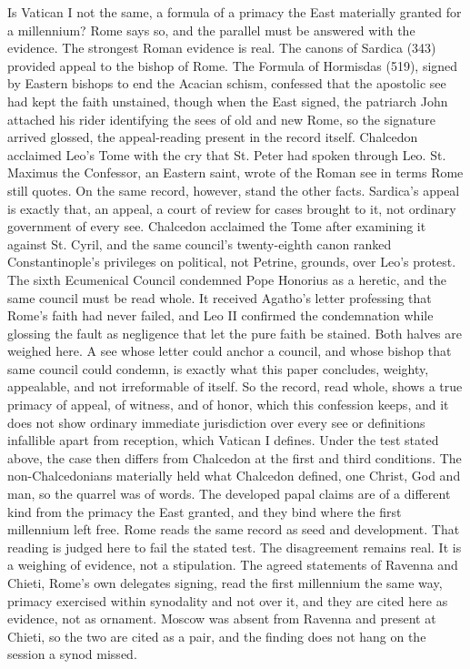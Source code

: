\documentclass[11pt,twoside]{article}
\newcommand{\unit}[1]{\needspace{3\baselineskip}\par\medskip{\normalfont\bfseries\color{subhead}#1}\par\nobreak\smallskip}
\begin{document}
\unit{The Roman evidence weighed.}
Is Vatican I not the same, a formula of a primacy the East materially granted for a millennium? Rome says so, and the parallel must be answered with the evidence. The strongest Roman evidence is real. The canons of Sardica (343) provided appeal to the bishop of Rome. The Formula of Hormisdas (519), signed by Eastern bishops to end the Acacian schism, confessed that the apostolic see had kept the faith unstained, though when the East signed, the patriarch John attached his rider identifying the sees of old and new Rome, so the signature arrived glossed, the appeal-reading present in the record itself. Chalcedon acclaimed Leo's Tome with the cry that St. Peter had spoken through Leo. St. Maximus the Confessor, an Eastern saint, wrote of the Roman see in terms Rome still quotes. On the same record, however, stand the other facts. Sardica's appeal is exactly that, an appeal, a court of review for cases brought to it, not ordinary government of every see. Chalcedon acclaimed the Tome after examining it against St. Cyril, and the same council's twenty-eighth canon ranked Constantinople's privileges on political, not Petrine, grounds, over Leo's protest. The sixth Ecumenical Council condemned Pope Honorius as a heretic, and the same council must be read whole. It received Agatho's letter professing that Rome's faith had never failed, and Leo II confirmed the condemnation while glossing the fault as negligence that let the pure faith be stained. Both halves are weighed here. A see whose letter could anchor a council, and whose bishop that same council could condemn, is exactly what this paper concludes, weighty, appealable, and not irreformable of itself. So the record, read whole, shows a true primacy of appeal, of witness, and of honor, which this confession keeps, and it does not show ordinary immediate jurisdiction over every see or definitions infallible apart from reception, which Vatican I defines. Under the test stated above, the case then differs from Chalcedon at the first and third conditions. The non-Chalcedonians materially held what Chalcedon defined, one Christ, God and man, so the quarrel was of words. The developed papal claims are of a different kind from the primacy the East granted, and they bind where the first millennium left free. Rome reads the same record as seed and development. That reading is judged here to fail the stated test. The disagreement remains real. It is a weighing of evidence, not a stipulation. The agreed statements of Ravenna and Chieti, Rome's own delegates signing, read the first millennium the same way, primacy exercised within synodality and not over it, and they are cited here as evidence, not as ornament. Moscow was absent from Ravenna and present at Chieti, so the two are cited as a pair, and the finding does not hang on the session a synod missed.
\end{document}
